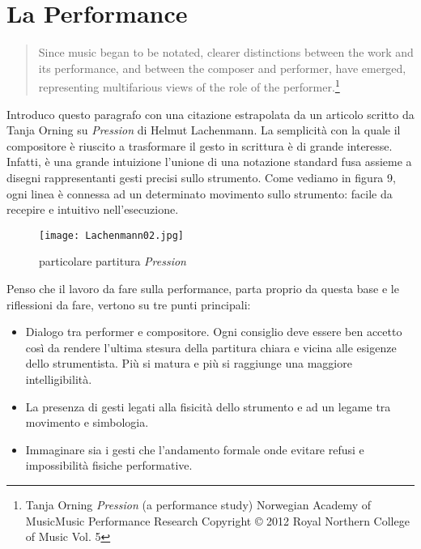 
\chapter{La Performance}
\label{chp:La Performance}

\begin{quotation}
Since music began to be notated, clearer distinctions between the work and its performance, and between the composer and performer, have emerged, representing multifarious views of the role of the performer.\footnote{Tanja Orning \textit{Pression} (a performance study) Norwegian Academy of MusicMusic Performance Research Copyright © 2012 Royal Northern College of Music Vol. 5}
\end{quotation}

Introduco questo paragrafo con una citazione estrapolata da un articolo scritto da Tanja Orning su \textit{Pression} di Helmut Lachenmann. La semplicità con la quale il compositore è riuscito a trasformare il gesto in scrittura è di grande interesse. Infatti, è una grande intuizione l'unione di una notazione standard fusa assieme a disegni rappresentanti gesti precisi sullo strumento. Come vediamo in figura 9, ogni linea è connessa ad un determinato movimento sullo strumento: facile da recepire e intuitivo nell'esecuzione. 

\begin{figure}[htbp]
\centering
\texttt{[image: Lachenmann02.jpg]}
\caption{particolare partitura \textit{Pression}}
\end{figure}

Penso che il lavoro da fare sulla performance, parta proprio da questa base e le riflessioni da fare, vertono su tre punti principali:
\begin{itemize}
\item{Dialogo tra performer e compositore. Ogni consiglio deve essere ben accetto così da rendere l'ultima stesura della partitura chiara e vicina alle esigenze dello strumentista. Più si matura e più si raggiunge una maggiore intelligibilità.}
\item{La presenza di gesti legati alla fisicità dello strumento e ad un legame tra movimento e simbologia.}
\item{Immaginare sia i gesti che l'andamento formale onde evitare refusi e impossibilità fisiche performative.}
\end{itemize}

